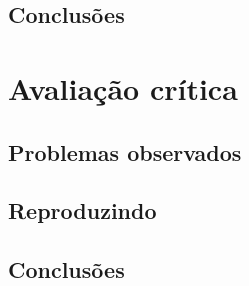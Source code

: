 \documentclass{beamer}
\begin{document}
\subsection{Conclusões}

\section{Avaliação crítica}

\subsection{Problemas observados}

\subsection{Reproduzindo}

\subsection{Conclusões}
\end{document}
